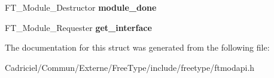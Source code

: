 \begin{DoxyCompactItemize}
\item 
F\+T\+\_\+\+Module\+\_\+\+Destructor {\bfseries module\+\_\+done}\hypertarget{struct_f_t___module___class___ab6e9c780519e24a51144df79692cf339}{}\label{struct_f_t___module___class___ab6e9c780519e24a51144df79692cf339}

\item 
F\+T\+\_\+\+Module\+\_\+\+Requester {\bfseries get\+\_\+interface}\hypertarget{struct_f_t___module___class___aa72d79fcd0991231e24e88f359244e8e}{}\label{struct_f_t___module___class___aa72d79fcd0991231e24e88f359244e8e}

\end{DoxyCompactItemize}


The documentation for this struct was generated from the following file\+:\begin{DoxyCompactItemize}
\item 
Cadriciel/\+Commun/\+Externe/\+Free\+Type/include/freetype/ftmodapi.\+h\end{DoxyCompactItemize}
